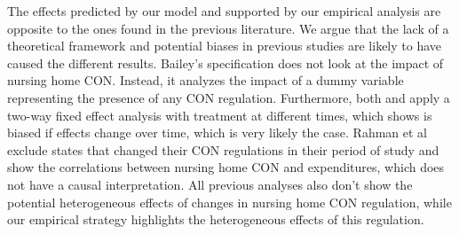 \documentclass[../Main.tex]{subfiles}
\begin{document}
\indent The effects predicted by our model and supported by our empirical analysis are opposite to the ones found in the previous literature. We argue that the lack of a theoretical framework and potential biases in previous studies are likely to have caused the different results. Bailey’s specification does not look at the impact of nursing home CON. Instead, it analyzes the impact of a dummy variable representing the presence of any CON regulation. Furthermore, both \citet{grabowski2003effects} and \citet{bailey2019can} apply a two-way fixed effect analysis with treatment at different times, which \citet{goodman2021difference} shows is biased if effects change over time, which is very likely the case. Rahman et al \citet{rahman2016impact} exclude states that changed their CON regulations in their period of study and show the correlations between nursing home CON and expenditures, which does not have a causal interpretation. All previous analyses also don’t show the potential heterogeneous effects of changes in nursing home CON regulation, while our empirical strategy highlights the heterogeneous effects of this regulation. 
\end{document}
